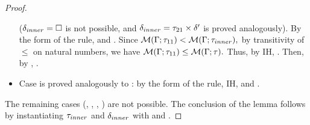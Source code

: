 \begin{proof}
\begin{itemize}
                {}
            ($\delta_{inner} = \square$ is not possible, and
            $\delta_{inner} = \tau_{21} \times \delta'$
            is proved analogously).
            By the form of the rule, 
            and .
            Since $\operatorname{\mathcal{M}}(\Gamma;\tau_{11}) < \operatorname{\mathcal{M}}(\Gamma;\tau_{inner}),$ 
            by transitivity of $\leq$ on natural numbers,
            we have $\operatorname{\mathcal{M}}(\Gamma;\tau_{11}) \leq \operatorname{\mathcal{M}}(\Gamma;\tau).$
            Thus, by IH, .
            Then, by ,
            \subtydflt
                {}
                {}.
        \item Case  is proved analogously 
            to : by the form of the rule, IH, and .
    \end{itemize}
    The remaining cases
    (, , , ) 
    are not possible.
    The conclusion of the lemma follows by instantiating $\tau_{inner}$
    and $\delta_{inner}$ with \ty and \dctx.
\end{proof}

